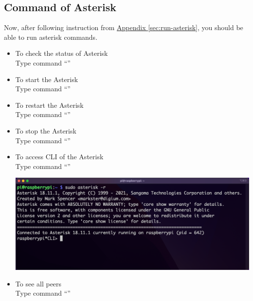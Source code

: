 	\subsection{Command of Asterisk}	\label{sec:command-asterisk}
	Now, after following instruction from \hyperref[sec:run-asterisk]{Appendix \ref{sec:run-asterisk}}, you should be able to run asterisk commands.
	\begin{itemize}
		\item To check the status of Asterisk\\
		Type command ``{\selectfont{sudo service asterisk status}}''
		\item To start the Asterisk\\
		Type command ``{\selectfont{sudo service asterisk start}}''
		\item To restart the Asterisk\\
		Type command ``{\selectfont{sudo service asterisk restart}}''
		\item To stop the Asterisk\\
		Type command ``{\selectfont{sudo service asterisk stop}}''
		\item To access CLI of the Asterisk\\
		Type command ``{\selectfont{sudo asterisk -r}}''\\
			\begin{minipage}{\textwidth}
				\vspace{2mm}
				\includegraphics[scale=0.21]{Images/raspberry_pi/asterisk_install/CLI.png}
				\vspace{2mm}
			\end{minipage}
		\item To see all peers\\
		Type command ``{\selectfont{sip show peers}}''\\
			\begin{minipage}{\textwidth}
				\vspace{2mm}

\end{minipage}
\end{itemize}

